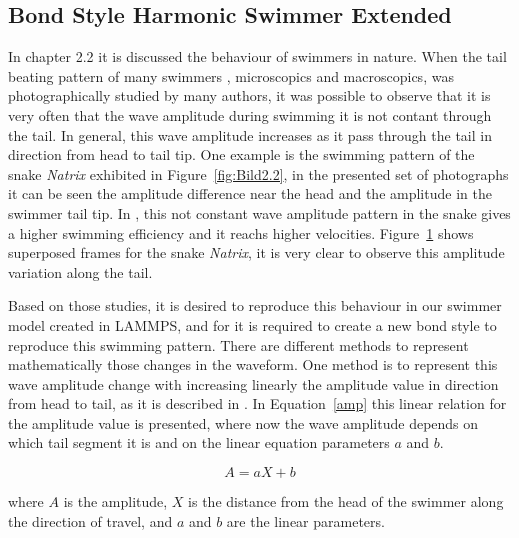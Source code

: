 \subsection{Bond Style Harmonic Swimmer Extended }
\label{sec:section 1}

In chapter 2.2 it is discussed the behaviour of swimmers in nature. When the tail beating pattern of many swimmers , microscopics and macroscopics, was photographically studied
by many authors, it was possible to observe that it is very often that the wave amplitude during swimming it is not contant through the tail. In general, this wave amplitude increases
as it pass through the tail in direction from head to tail tip. One example is the swimming pattern of the snake \textit{Natrix} exhibited in Figure~\ref{fig:Bild2.2}, in the presented set
of photographs it can be seen the amplitude difference near the head and the amplitude in the swimmer tail tip. In \cite{taylor_analysis_1952}, this not constant wave amplitude
pattern in the snake gives a higher swimming efficiency and it reachs higher velocities. Figure~\ref{fig:Bild3.5} shows superposed frames for the snake \textit{Natrix}, it is very
clear to observe this amplitude variation along the tail.\par

\begin{figure}[H]
\centering
  \begin{footnotesize}
  
  \caption[]{}
  \label{fig:Bild3.5}
  \end{footnotesize}
\end{figure} 

Based on those studies, it is desired to reproduce this behaviour in our swimmer model created in LAMMPS, and for it is required to create a new bond style to reproduce this swimming
pattern. There are different methods to represent mathematically those changes in the waveform. One method is to represent this wave amplitude change with increasing linearly the 
amplitude value in direction from head to tail, as it is described in \cite{jayne_swimming_1985}. In Equation~\ref{amp} this linear relation for the amplitude value is presented,
where now the wave amplitude depends on which tail segment it is and on the linear equation parameters $a$ and $b$.

\begin{equation}\label{amp}
  A = a X + b
\end{equation}

where $A$ is the amplitude, $X$ is the distance from the head of the swimmer along the direction of travel, and $a$ and $b$ are the linear parameters.\par

